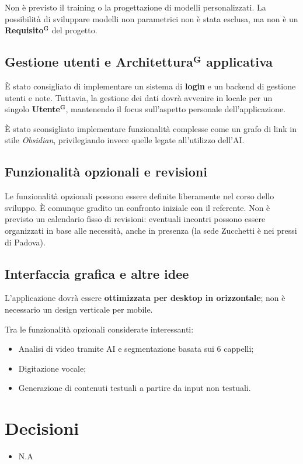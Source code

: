 \documentclass[a4paper,12pt]{article}
\newcommand{\term}[1]{\textbf{#1}$^\mathbf{G}$}
\begin{document}
Non è previsto il training o la progettazione di modelli personalizzati. La possibilità di sviluppare modelli non parametrici non è stata esclusa, ma non è un \term{Requisito} del progetto.

\subsection{Gestione utenti e \texorpdfstring{\term{Architettura}}{\term{Architettura}} applicativa}
È stato consigliato di implementare un sistema di \textbf{login} e un backend di gestione utenti e note. Tuttavia, la gestione dei dati dovrà avvenire in locale per un singolo \term{Utente}, mantenendo il focus sull’aspetto personale dell’applicazione.

È stato sconsigliato implementare funzionalità complesse come un grafo di link in stile \textit{Obsidian}, privilegiando invece quelle legate all’utilizzo dell’AI.

\subsection{Funzionalità opzionali e revisioni}
Le funzionalità opzionali possono essere definite liberamente nel corso dello sviluppo. È comunque gradito un confronto iniziale con il referente.
Non è previsto un calendario fisso di revisioni: eventuali incontri possono essere organizzati in base alle necessità, anche in presenza (la sede Zucchetti è nei pressi di Padova).

\subsection{Interfaccia grafica e altre idee}
L’applicazione dovrà essere \textbf{ottimizzata per desktop in orizzontale}; non è necessario un design verticale per mobile.

Tra le funzionalità opzionali considerate interessanti:
\begin{itemize}
    \item Analisi di video tramite AI e segmentazione basata sui 6 cappelli;
    \item Digitazione vocale;
    \item Generazione di contenuti testuali a partire da input non testuali.
\end{itemize}

\section{Decisioni}
\begin{itemize}
    \item N.A
\end{itemize}
\end{document}

